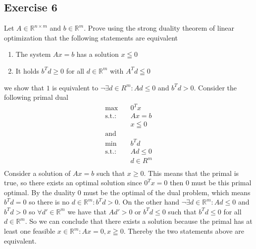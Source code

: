 \subsection{Exercise 6}
Let $A \in \mathbb{R}^{n \times  m}$ and $b \in \mathbb{R}^{m}$. Prove using
the strong duality theorem of linear optimization that the following
statements are equivalent
\begin{enumerate}
    \item The system $Ax = b$ has a solution $x \leqq 0$
    \item It holds $b^{T}d \ge 0$ for all $d \in \mathbb{R}^{m}$ with $A^{T}d
        \leqq 0$
\end{enumerate}
we show that $1$ is equivalent to $\neg \exists d \in R^{m}: Ad \le 0$
and $b^{T}d > 0$. Consider the following primal dual
\begin{align}
    \text{max}\quad & 0^{T}x\\
    \text{s.t.:}\quad & Ax=b\nonumber\\
                      &x\leqq 0\nonumber\\
    \text{and}\nonumber\\
    \text{min}\quad & b^{T}d\\
    \text{s.t.:}\quad & Ad\le 0\nonumber\\
                      &d \in R^{m}\nonumber\\
\end{align}
Consider a solution of $Ax = b$ such that $x \ge 0$. This means that the
primal is true, so there exists an optimal solution since $0^{T}x=0$ then $0$
must be this primal optimal. By the duality $0$ must be the optimal of the
dual problem, which means $b^{T}d =0 $  so there is no $d \in \mathbb{R}^{m}:
b^{T}d >0$.\newline
On the other hand $\neg \exists d \in \mathbb{R}^{m}: Ad \le 0$ and $b^{T}d
>0$ so $\forall d' \in \mathbb{R}^{m}$ we have that $Ad' > 0$ or $b^{T}d \le
0$ such that $b^{T}d \leq 0 $ for all $d \in \mathbb{R}^{m}$. So we can
conclude that there exists a solution because the primal has at least one
feasible $x \in \mathbb{R}^{m}: Ax = 0, x\geqq 0$. Thereby the two statements
above are equivalent.




